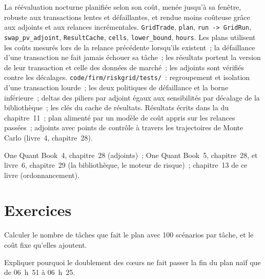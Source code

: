 \begin{build}
 La réévaluation nocturne planifiée selon son coût, menée jusqu'à sa fenêtre, robuste aux transactions lentes et défaillantes, et rendue moins coûteuse grâce
aux adjoints et aux relances incrémentales.
 \texttt{GridTrade}, \texttt{plan}, \texttt{run -> GridRun}, \texttt{swap\_pv\_adjoint}, \texttt{ResultCache},
\texttt{cells}, \texttt{lower\_bound}, \texttt{hours}.
 Les plans utilisent les coûts mesurés lors de la relance précédente lorsqu'ils existent~; la défaillance d'une transaction ne fait jamais échouer sa tâche~; les résultats portent
la version de leur transaction et celle des données de marché~; les adjoints sont vérifiés contre les décalages.
 \texttt{code/firm/riskgrid/tests/}~: regroupement et isolation d'une transaction lourde~; les deux politiques de défaillance et la
borne inférieure~; deltas des piliers par adjoint égaux aux sensibilités par décalage de la bibliothèque~; les clés du cache de résultats.
 Résultats écrits dans la  du chapitre~11~; plan alimenté par un modèle de coût appris sur les relances passées~; adjoints
avec points de contrôle à travers les trajectoires de Monte Carlo (livre~4, chapitre~28).
\end{build}

\begin{omsources}
\item One Quant Book~4, chapitre~28 (adjoints)~; One Quant Book~5, chapitre~28, et livre~6, chapitre~29 (la bibliothèque, le moteur de risque)~; chapitre~13 de ce livre (ordonnancement).
\end{omsources}

\section{Exercices}

\begin{exercise}[$\star$]\label{exo:pl:the-risk-grid:1}
Calculer le nombre de tâches que fait le plan avec 100 scénarios par tâche, et le coût fixe qu'elles ajoutent.
\end{exercise}

\begin{exercise}[$\star$]\label{exo:pl:the-risk-grid:2}
Expliquer pourquoi le doublement des cœurs ne fait passer la fin du plan naïf que de 06~h~51 à 06~h~25.
\end{exercise}

